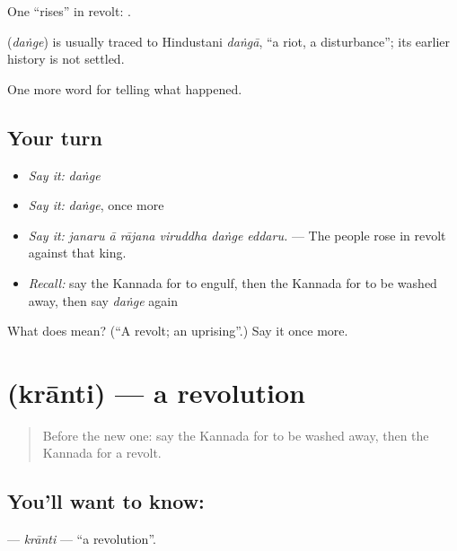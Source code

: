 One \textquotedblleft{}rises\textquotedblright{} in revolt:  .

\begin{cousinweb}
\textbf{} (\emph{daṅge}) is usually traced to Hindustani \emph{daṅgā}, \textquotedblleft{}a riot, a disturbance\textquotedblright{}; its earlier history is not settled.
\end{cousinweb}

\begin{grammarlens}[title={What you've built}]
One more word for telling what happened.
\end{grammarlens}

\subsection*{Your turn}
\begin{itemize}
\raggedright
  \item \emph{Say it:} \emph{daṅge}
  \item \emph{Say it:} \emph{daṅge}, once more
  \item \emph{Say it:} \emph{janaru ā rājana viruddha daṅge eddaru.} — The people rose in revolt against that king.
  \item \emph{Recall:} say the Kannada for to engulf, then the Kannada for to be washed away, then say \emph{daṅge} again
\end{itemize}

\begin{tcolorbox}[breakable,colback=teal!4,colframe=teal!35!black,title={Before you move on}]
What does  mean? (\textquotedblleft{}A revolt; an uprising\textquotedblright{}.) Say it once more.
\end{tcolorbox}
\section[\texorpdfstring{\kn{ಕ್ರಾಂತಿ} (krānti)}{ಕ್ರಾಂತಿ (krānti)}]{ (krānti) — a revolution}

\label{lesson:KA-C352-kranti}



\begin{quote}
Before the new one: say the Kannada for to be washed away, then the Kannada for a revolt.
\end{quote}

\subsection*{You'll want to know: }
\textbf{} — \emph{krānti} — \textquotedblleft{}a revolution\textquotedblright{}.

